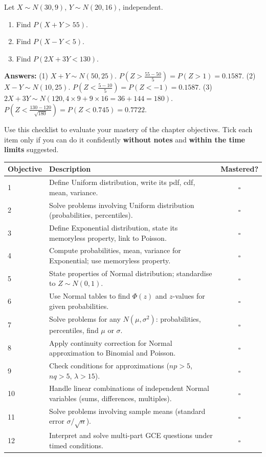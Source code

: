 \documentclass[11pt]{article}
\newcounter{popsec}
\newcounter{popsub}
\newcommand{\courssub}[1]{%
  \stepcounter{popsub}%
  \par\vspace{9pt}\noindent{\popxbold\fontsize{11.5}{13}\selectfont\color{popink}{\color{poporange}\thepopsec.\thepopsub}\hspace{6pt}#1}\par\nopagebreak\vspace{4pt}
}
\begin{document}
\begin{methode}
Let $X\sim N(30, 9)$, $Y\sim N(20, 16)$, independent.
\begin{enumerate}
\item Find $P(X+Y > 55)$.
\item Find $P(X-Y < 5)$.
\item Find $P(2X+3Y < 130)$.
\end{enumerate}
\textbf{Answers:} (1) $X+Y\sim N(50, 25)$. $P(Z>\frac{55-50}{5})=P(Z>1)=0.1587$. (2) $X-Y\sim N(10, 25)$. $P(Z<\frac{5-10}{5})=P(Z<-1)=0.1587$. (3) $2X+3Y\sim N(120, 4\times9+9\times16=36+144=180)$. $P(Z<\frac{130-120}{\sqrt{180}})=P(Z<0.745)=0.7722$.
\end{methode}

\courssub{Self-Assessment Checklist}

Use this checklist to evaluate your mastery of the chapter objectives. Tick each item only if you can do it confidently \textbf{without notes} and \textbf{within the time limits} suggested.

\begin{center}
\begin{tabularx}{\linewidth}{|l|X|c|}
\hline
\rowcolor{popblueL}
\textbf{Objective} & \textbf{Description} & \textbf{Mastered?} \\
\hline
1 & Define Uniform distribution, write its pdf, cdf, mean, variance. & $\square$ \\
\hline
2 & Solve problems involving Uniform distribution (probabilities, percentiles). & $\square$ \\
\hline
3 & Define Exponential distribution, state its memoryless property, link to Poisson. & $\square$ \\
\hline
4 & Compute probabilities, mean, variance for Exponential; use memoryless property. & $\square$ \\
\hline
5 & State properties of Normal distribution; standardise to $Z\sim N(0,1)$. & $\square$ \\
\hline
6 & Use Normal tables to find $\Phi(z)$ and $z$-values for given probabilities. & $\square$ \\
\hline
7 & Solve problems for any $N(\mu,\sigma^2)$: probabilities, percentiles, find $\mu$ or $\sigma$. & $\square$ \\
\hline
8 & Apply continuity correction for Normal approximation to Binomial and Poisson. & $\square$ \\
\hline
9 & Check conditions for approximations ($np>5$, $nq>5$, $\lambda>15$). & $\square$ \\
\hline
10 & Handle linear combinations of independent Normal variables (sums, differences, multiples). & $\square$ \\
\hline
11 & Solve problems involving sample means (standard error $\sigma/\sqrt{n}$). & $\square$ \\
\hline
12 & Interpret and solve multi-part GCE questions under timed conditions. & $\square$ \\
\hline
\end{tabularx}
\end{center}
\end{document}
